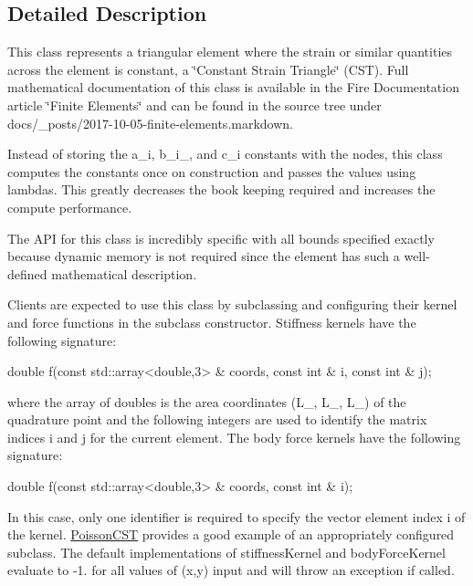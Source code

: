 \subsection{Detailed Description}
This class represents a triangular element where the strain or similar quantities across the element is constant, a \char`\"{}\+Constant Strain Triangle\char`\"{} (C\+ST). Full mathematical documentation of this class is available in the Fire Documentation article \char`\"{}\+Finite Elements\char`\"{} and can be found in the source tree under docs/\+\_\+posts/2017-\/10-\/05-\/finite-\/elements.\+markdown.

Instead of storing the a\+\_\+i, b\+\_\+i\+\_\+, and c\+\_\+i constants with the nodes, this class computes the constants once on construction and passes the values using lambdas. This greatly decreases the book keeping required and increases the compute performance.

The A\+PI for this class is incredibly specific with all bounds specified exactly because dynamic memory is not required since the element has such a well-\/defined mathematical description.

Clients are expected to use this class by subclassing and configuring their kernel and force functions in the subclass\textquotesingle{} constructor. Stiffness kernels have the following signature\+: 
\begin{DoxyCode}
\textcolor{keywordtype}{double} f(\textcolor{keyword}{const} std::array<double,3> & coords, \textcolor{keyword}{const} \textcolor{keywordtype}{int} & i,
\textcolor{keyword}{const} \textcolor{keywordtype}{int} & j);
\end{DoxyCode}
 where the array of doubles is the area coordinates (L\+\_, L\+\_, L\+\_) of the quadrature point and the following integers are used to identify the matrix indices i and j for the current element. The body force kernels have the following signature\+: 
\begin{DoxyCode}
\textcolor{keywordtype}{double} f(\textcolor{keyword}{const} std::array<double,3> & coords, \textcolor{keyword}{const} \textcolor{keywordtype}{int} & i);
\end{DoxyCode}
 In this case, only one identifier is required to specify the vector element index i of the kernel. \hyperlink{a00780}{Poisson\+C\+ST} provides a good example of an appropriately configured subclass. The default implementations of stiffness\+Kernel and body\+Force\+Kernel evaluate to -\/1. for all values of (x,y) input and will throw an exception if called. 

